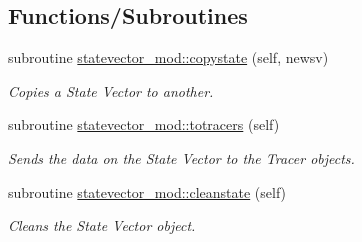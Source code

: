 \subsection*{Functions/\+Subroutines}
\begin{DoxyCompactItemize}
\item 
subroutine \mbox{\hyperlink{namespacestatevector__mod_afb7f6650aedee27644d33416d3a49fc0}{statevector\+\_\+mod\+::copystate}} (self, newsv)
\begin{DoxyCompactList}\small\item\em Copies a State Vector to another. \end{DoxyCompactList}\item 
subroutine \mbox{\hyperlink{namespacestatevector__mod_af0831dbae02e8ec94c576224cae673e5}{statevector\+\_\+mod\+::totracers}} (self)
\begin{DoxyCompactList}\small\item\em Sends the data on the State Vector to the Tracer objects. \end{DoxyCompactList}\item 
subroutine \mbox{\hyperlink{namespacestatevector__mod_acb2d2a7c4c5ee5d86a601be7db58c1df}{statevector\+\_\+mod\+::cleanstate}} (self)
\begin{DoxyCompactList}\small\item\em Cleans the State Vector object. \end{DoxyCompactList}\end{DoxyCompactItemize}
